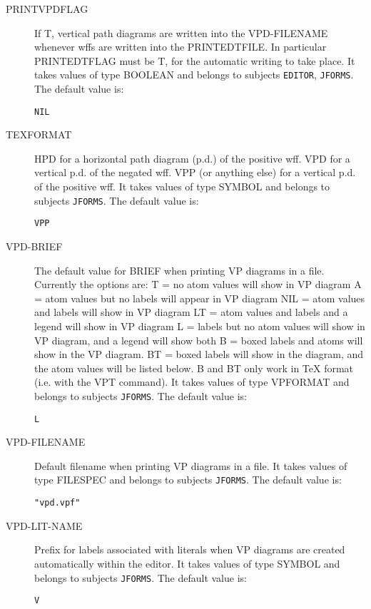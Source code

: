 \begin{description}
\item[PRINTVPDFLAG]  
If T, vertical path diagrams are written into the VPD-FILENAME
whenever wffs are written into the PRINTEDTFILE.  In particular PRINTEDTFLAG
must be T, for the automatic writing to take place.
It takes values of type BOOLEAN and belongs to subjects \texttt{EDITOR}, \texttt{JFORMS}.  The default value is: \begin{lstlisting}
NIL
\end{lstlisting}

\item[TEXFORMAT]  
HPD for a horizontal path diagram (p.d.) of the positive wff.
VPD for a vertical p.d. of the negated wff.
VPP (or anything else) for a vertical p.d. of the positive wff.
It takes values of type SYMBOL and belongs to subjects \texttt{JFORMS}.  The default value is: \begin{lstlisting}
VPP
\end{lstlisting}

\item[VPD-BRIEF]  
The default value for BRIEF when printing VP diagrams in a file.
Currently the options are:
T   = no atom values will show in VP diagram
A   = atom values but no labels will appear in VP diagram
NIL = atom values and labels will show in VP diagram
LT  = atom values and  labels and a legend will show in VP diagram 
L   = labels but no atom values will show in VP diagram,
      and a legend will show both
B   = boxed labels and atoms will show in the VP diagram.
BT  = boxed labels will show in the diagram, and the atom values
      will be listed below.
B and BT only work in TeX format (i.e. with the VPT command).
It takes values of type VPFORMAT and belongs to subjects \texttt{JFORMS}.  The default value is: \begin{lstlisting}
L
\end{lstlisting}

\item[VPD-FILENAME]  
Default filename when printing VP diagrams in a file.
It takes values of type FILESPEC and belongs to subjects \texttt{JFORMS}.  The default value is: \begin{lstlisting}
"vpd.vpf"
\end{lstlisting}

\item[VPD-LIT-NAME]  
Prefix for labels associated with literals when VP diagrams are
created automatically within the editor.
It takes values of type SYMBOL and belongs to subjects \texttt{JFORMS}.  The default value is: \begin{lstlisting}
V
\end{lstlisting}


\end{description}
